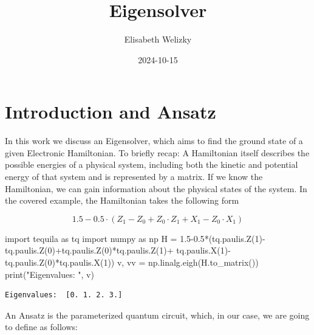 \documentclass[
  letterpaper,
  DIV=11,
  numbers=noendperiod]{scrartcl}
\title{Eigensolver}
\author{Elisabeth Welizky}
\date{2024-10-15}
\newenvironment{Shaded}{\begin{snugshade}}{\end{snugshade}}
\newcommand{\BuiltInTok}[1]{\textcolor[rgb]{0.00,0.23,0.31}{#1}}
\newcommand{\DecValTok}[1]{\textcolor[rgb]{0.68,0.00,0.00}{#1}}
\newcommand{\FloatTok}[1]{\textcolor[rgb]{0.68,0.00,0.00}{#1}}
\newcommand{\ImportTok}[1]{\textcolor[rgb]{0.00,0.46,0.62}{#1}}
\newcommand{\NormalTok}[1]{\textcolor[rgb]{0.00,0.23,0.31}{#1}}
\newcommand{\OperatorTok}[1]{\textcolor[rgb]{0.37,0.37,0.37}{#1}}
\newcommand{\StringTok}[1]{\textcolor[rgb]{0.13,0.47,0.30}{#1}}
\renewcommand*\contentsname{Table of contents}
\newcommand\contentsname{Table of contents}
\begin{document}
\maketitle

\renewcommand*\contentsname{Table of contents}
{
\hypersetup{linkcolor=}
\setcounter{tocdepth}{3}
\tableofcontents
}
\section{Introduction and Ansatz}\label{introduction-and-ansatz}

In this work we discuss an Eigensolver, which aims to find the ground
state of a given Electronic Hamiltonian. To briefly recap: A Hamiltonian
itself describes the possible energies of a physical system, including
both the kinetic and potential energy of that system and is represented
by a matrix. If we know the Hamiltonian, we can gain information about
the physical states of the system. In the covered example, the
Hamiltonian takes the following form

\[ 1.5  - 0.5 \cdot (Z_1 - Z_0 + Z_0 \cdot Z_1 + X_1 - Z_0 \cdot X_1)\]

\begin{Shaded}
\begin{Highlighting}[]
\ImportTok{import}\NormalTok{ tequila }\ImportTok{as}\NormalTok{ tq}
\ImportTok{import}\NormalTok{ numpy }\ImportTok{as}\NormalTok{ np}
\NormalTok{H }\OperatorTok{=} \FloatTok{1.5}\OperatorTok{{-}}\FloatTok{0.5}\OperatorTok{*}\NormalTok{(tq.paulis.Z(}\DecValTok{1}\NormalTok{)}\OperatorTok{{-}}\NormalTok{tq.paulis.Z(}\DecValTok{0}\NormalTok{)}\OperatorTok{+}\NormalTok{tq.paulis.Z(}\DecValTok{0}\NormalTok{)}\OperatorTok{*}\NormalTok{tq.paulis.Z(}\DecValTok{1}\NormalTok{)}\OperatorTok{+}\NormalTok{ tq.paulis.X(}\DecValTok{1}\NormalTok{)}\OperatorTok{{-}}\NormalTok{tq.paulis.Z(}\DecValTok{0}\NormalTok{)}\OperatorTok{*}\NormalTok{tq.paulis.X(}\DecValTok{1}\NormalTok{))}
\NormalTok{v, vv }\OperatorTok{=}\NormalTok{ np.linalg.eigh(H.to\_matrix())}
\BuiltInTok{print}\NormalTok{(}\StringTok{"Eigenvalues: "}\NormalTok{, v)}
\end{Highlighting}
\end{Shaded}

\begin{verbatim}
Eigenvalues:  [0. 1. 2. 3.]
\end{verbatim}

An Ansatz is the parameterized quantum circuit, which, in our case, we
are going to define as follows:
\end{document}
